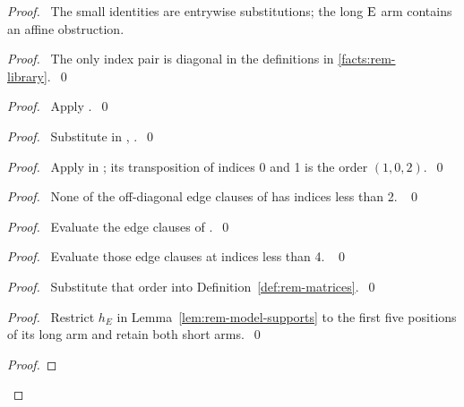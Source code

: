 \begin{proof}
\pfsketch\ The small identities are entrywise substitutions; the long
$\mathrm{E}$ arm contains an affine obstruction.
\begin{proof}\pf\ The only index pair is diagonal in the definitions in
\ref{facts:rem-library}.~\qed\end{proof}
\begin{proof}\pf\ Apply .~\qed\end{proof}
\begin{proof}\pf\ Substitute in ,
.~\qed\end{proof}
\begin{proof}\pf\ Apply  in
; its transposition
of indices 0 and 1 is the order $(1,0,2)$.~\qed\end{proof}
\begin{proof}\pf\ None of the off-diagonal edge clauses of
 has indices less than 2. ~\qed\end{proof}
\begin{proof}\pf\ Evaluate the edge clauses of .~\qed\end{proof}
\begin{proof}\pf\ Evaluate those edge clauses at indices less than 4. ~\qed\end{proof}
\begin{proof}\pf\ Substitute that order into Definition~\ref{def:rem-matrices}.~\qed\end{proof}
\begin{proof}\pf\ Restrict $h_E$ in Lemma~\ref{lem:rem-model-supports} to
the first five positions of its long arm and retain both short arms.~\qed\end{proof}
\begin{proof}

\end{proof}
\end{proof}
